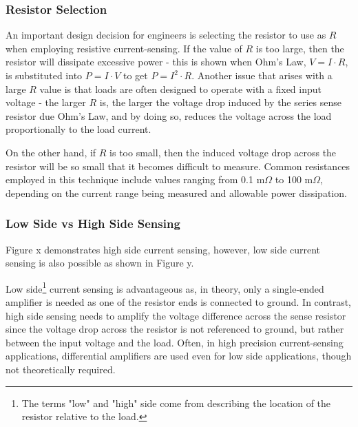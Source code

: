 \documentclass[main.tex]{subfiles}
\begin{document}

\subsubsection{Resistor Selection}
An important design decision for engineers is selecting the resistor to use as $R$ when employing resistive current-sensing. If the value of $R$ is too large, then the resistor will dissipate excessive power - this is shown when Ohm's Law, $V=I \cdot R$, is substituted into $P=I \cdot V$ to get $P=I^{2} \cdot R$. Another issue that arises with a large $R$ value is that loads are often designed to operate with a fixed input voltage - the larger $R$ is, the larger the voltage drop induced by the series sense resistor due Ohm's Law, and by doing so, reduces the voltage across the load proportionally to the load current. \newline

\newnoindentpara On the other hand, if $R$ is too small, then the induced voltage drop across the resistor will be so small that it becomes difficult to measure. Common resistances employed in this technique include values ranging from 0.1 m$\Omega$ to 100 m$\Omega$, depending on the current range being measured and allowable power dissipation.

\subsubsection{Low Side vs High Side Sensing}
Figure x demonstrates high side current sensing, however, low side current sensing is also possible as shown in Figure y.


\noindent Low side\footnote{The terms "low" and "high" side come from describing the location of the resistor relative to the load.} current sensing is advantageous as, in theory, only a single-ended amplifier is needed as one of the resistor ends is connected to ground. In contrast, high side sensing needs to amplify the voltage difference across the sense resistor since the voltage drop across the resistor is not referenced to ground, but rather between the input voltage and the load. Often, in high precision current-sensing applications, differential amplifiers are used even for low side applications, though not theoretically required. %
\end{document}
